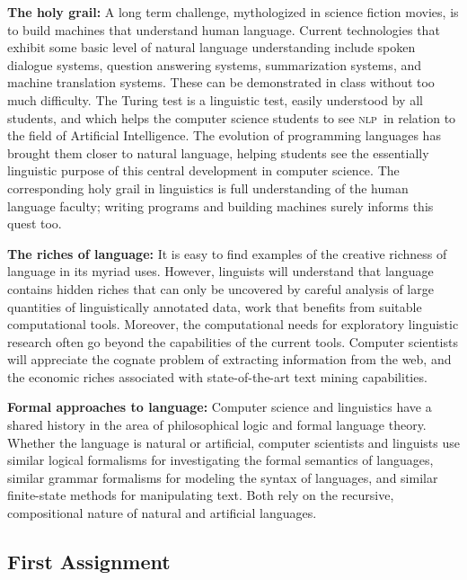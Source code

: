 \documentclass[11pt]{article}
\newcommand{\NLP}{\textsc{nlp}}
\begin{document}
\textbf{The holy grail:}
A long term challenge, mythologized in science fiction movies, is to
build machines that understand human language.  Current technologies
that exhibit some basic level of natural language understanding include
spoken dialogue systems, question answering systems, summarization
systems, and machine translation systems.  These can be demonstrated
in class without too much difficulty.  The Turing test is a linguistic
test, easily understood by all students, and which helps the computer science
students to see \NLP\ in relation to the field of Artificial Intelligence.
The evolution of programming languages has brought them closer to natural language,
helping students see the essentially linguistic purpose of this central development
in computer science.  The corresponding holy grail in linguistics is full
understanding of the human language faculty; writing programs and building machines
surely informs this quest too.

\textbf{The riches of language:}
It is easy to find examples of the creative richness of language in
its myriad uses.  However, linguists will understand that language
contains hidden riches that can only be uncovered by careful analysis
of large quantities of linguistically annotated data, work that
benefits from suitable computational tools.  Moreover, the
computational needs for exploratory linguistic research often go
beyond the capabilities of the current tools.  Computer scientists
will appreciate the cognate problem of extracting information from the
web, and the economic riches associated with state-of-the-art text
mining capabilities.

\textbf{Formal approaches to language:}
Computer science and linguistics have a shared history in the area of
philosophical logic and formal language theory.  Whether the language
is natural or artificial, computer scientists and linguists use
similar logical formalisms for investigating the formal semantics of
languages, similar grammar formalisms for modeling the syntax of
languages, and similar finite-state methods for manipulating text.
Both rely on the recursive, compositional nature of natural and
artificial languages.

\subsection{First Assignment}
\end{document}

